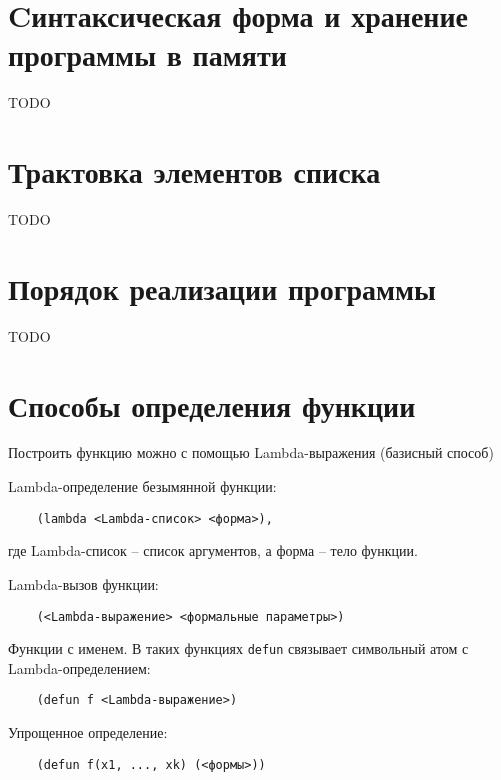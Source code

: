 \section{Cинтаксическая форма и хранение программы в памяти}

TODO


\section{Трактовка элементов списка}

TODO


\section{Порядок реализации программы}

TODO


\section{Способы определения функции}

Построить функцию можно с помощью Lambda-выражения (базисный способ)

Lambda-определение безымянной функции:

\begin{lstlisting}
    (lambda <Lambda-список> <форма>),
\end{lstlisting}

где Lambda-список -- список аргументов, а форма -- тело функции.

Lambda-вызов функции:

\begin{lstlisting}
    (<Lambda-выражение> <формальные параметры>)
\end{lstlisting}

Функции с именем. В таких функциях \texttt{defun} связывает символьный атом с Lambda-определением:

\begin{lstlisting}
    (defun f <Lambda-выражение>)
\end{lstlisting}

Упрощенное определение:

\begin{lstlisting}
    (defun f(x1, ..., xk) (<формы>))
\end{lstlisting}
